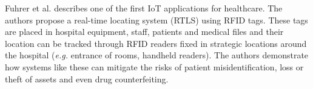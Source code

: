 


%
%
%
%


Fuhrer et al. \cite{Fuhrer2006} describes one of the first IoT applications for healthcare. The authors propose a real-time locating system (RTLS) using \acs{RFID} tags. These tags are placed in hospital equipment, staff, patients and medical files and their location can be tracked through \acs{RFID} readers fixed in strategic locations around the hospital (\textit{e.g.} entrance of rooms, handheld readers). The authors demonstrate how systems like these can mitigate the risks of patient misidentification, loss or theft of assets and even drug counterfeiting. 


